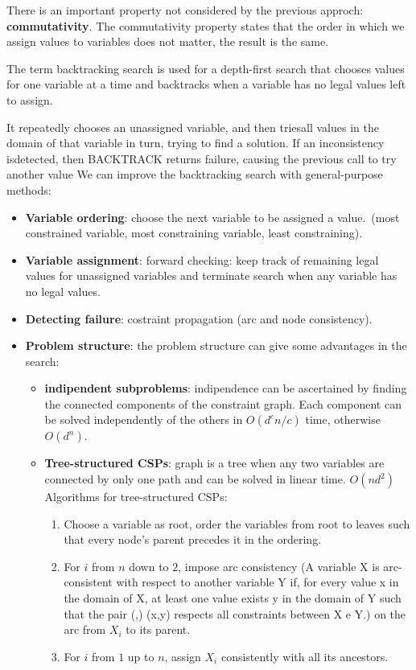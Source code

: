 \documentclass[12pt]{article}
\begin{document}
\begin{enumerate}
    There is an important property not considered by the previous approch: \textbf{commutativity}.
    The commutativity property states that the order in which we assign values to variables does not matter, the result is the same.
    
    The term backtracking search is used for a depth-first search that chooses values for one variable at a time and backtracks when a variable has no legal values left to assign.

    It repeatedly chooses an unassigned variable, and then triesall values in the domain of that variable in turn, trying to find a solution. 
    If an inconsistency isdetected, then BACKTRACK returns failure, causing the previous call to try another value
    We can improve the backtracking search with general-purpose methods:
    \begin{itemize}
        \item \textbf{Variable ordering}: choose the next variable to be assigned a value.\ (most constrained variable, most constraining variable, least constraining).
        \item \textbf{Variable assignment}: forward checking: keep track of remaining legal values for unassigned variables and terminate search when any variable has no legal values.
        \item \textbf{Detecting failure}: costraint propagation (arc and node consistency). 
        \item \textbf{Problem structure}: the problem structure can give some advantages in the search:
        \begin{itemize}
            \item \textbf{indipendent subproblems}: indipendence can be ascertained by finding the connected components of the constraint graph.
            Each component can be solved independently of the others in $O(d^cn/c)$ time, otherwise $O(d^n)$.
            \item \textbf{Tree-structured CSPs}: graph is a tree when any two variables are connected by only one path and can be solved in linear time. $O(nd^2)$
            Algorithms for tree-structured CSPs:
            \begin{enumerate}
                \item Choose a variable as root, order the variables from root to leaves such that every node's parent precedes it in the ordering.
                \item For $i$ from $n$ down to $2$, impose arc consistency (A variable X is arc-consistent with respect to another variable Y if, 
                for every value x in the domain of X, at least one value exists y in the domain of Y such that the pair (,) (x,y) 
                respects all constraints between X e Y.) on the arc from $X_i$ to its parent.
                \item For $i$ from $1$ up to $n$, assign $X_i$ consistently with all its ancestors.
            \end{enumerate}
        \end{itemize}
    \end{itemize}


\end{enumerate}
\end{document}
